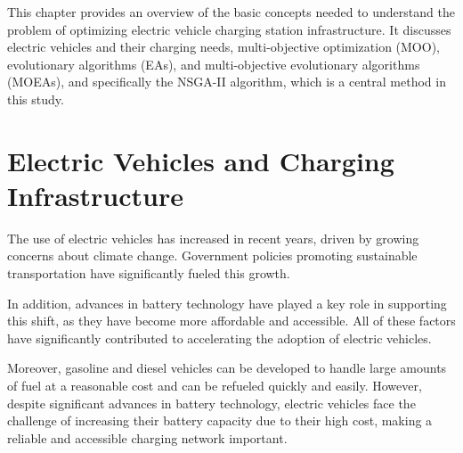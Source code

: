 This chapter provides an overview of the basic concepts needed to understand the problem of optimizing electric vehicle charging station infrastructure. It discusses electric vehicles and their charging needs, multi-objective optimization (MOO), evolutionary algorithms (EAs), and multi-objective evolutionary algorithms (MOEAs), and specifically the NSGA-II algorithm, which is a central method in this study.

\section{Electric Vehicles and Charging Infrastructure}

The use of electric vehicles has increased in recent years, driven by growing concerns about climate change. Government policies promoting sustainable transportation have significantly fueled this growth.

In addition, advances in battery technology have played a key role in supporting this shift, as they have become more affordable and accessible. All of these factors have significantly contributed to accelerating the adoption of electric vehicles.

Moreover, gasoline and diesel vehicles can be developed to handle large amounts of fuel at a reasonable cost and can be refueled quickly and easily. However, despite significant advances in battery technology, electric vehicles face the challenge of increasing their battery capacity due to their high cost, making a reliable and accessible charging network important.



